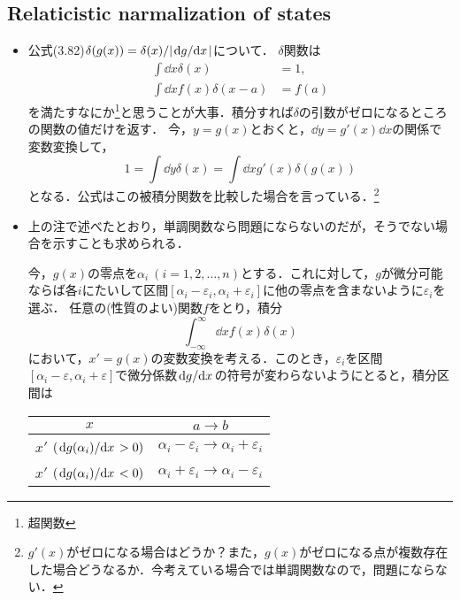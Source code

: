 \subsection{Relaticistic narmalization of states}
\begin{itemize}
		\item 公式(3.82)$\delta(g(x)) = \delta(x)/\lvert\dv*{g}{x}\rvert$について．
				$\delta $関数は
				\begin{align}
						\int \dd{x} \delta(x) &= 1, \\
						\int \dd{x} f(x)\delta(x-a) &= f(a)
				\end{align}
				を満たすなにか\footnote{超関数}と思うことが大事．積分すれば$\delta $の引数がゼロになるところの関数の値だけを返す．
				今，$y=g(x)  $とおくと，$\dd{y} = g'(x)\dd{x} $の関係で変数変換して，
				\begin{equation}
						1 = \int\dd{y} \delta(x) = \int \dd{x}g'(x)\delta(g(x))
				\end{equation}
				となる．公式はこの被積分関数を比較した場合を言っている．\footnote{$g'(x)$がゼロになる場合はどうか？また，$g(x) $がゼロになる点が複数存在した場合どうなるか．今考えている場合では単調関数なので，問題にならない．}
		\item 上の注で述べたとおり，単調関数なら問題にならないのだが，そうでない場合を示すことも求められる．

				今，$g(x) $の零点を$\alpha_i \ (i=1, 2, \ldots, n)$とする．これに対して，$g $が微分可能ならば各$i $にたいして区間$[\alpha_i-\varepsilon_i, \alpha_i + \varepsilon_i] $に他の零点を含まないように$\varepsilon_i $を選ぶ．
				任意の(性質のよい)関数$f $をとり，積分
				\begin{equation}
						\int_{-\infty}^{\infty}\dd{x}f(x)\delta(x)
				\end{equation}
				において，$x' = g(x) $の変数変換を考える．このとき，$\varepsilon_i $を区間$[\alpha_i-\varepsilon, \alpha_i+\varepsilon] $で微分係数$\dv*{g}{x} $の符号が変わらないようにとると，積分区間は
				\begin{table}[htbp]
						\centering
						\begin{tabular}{c|c}\hline
								$x $ & $a \to b$\\\hline
								 $x' $ $(\dv*{g(\alpha_i)}{x}>0 )$ & $\alpha_i-\varepsilon_i \to \alpha_i + \varepsilon_i $\\\hline
								 $x' $ $(\dv*{g(\alpha_i)}{x}<0 )$& $\alpha_i+\varepsilon_i \to \alpha_i-\varepsilon_i$\\\hline
						\end{tabular}
				\end{table}


\end{itemize}
